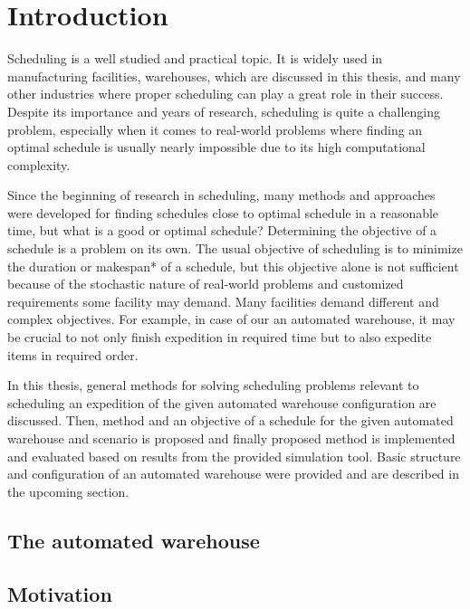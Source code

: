 \documentclass{ctuthesis}
\begin{document}
\maketitle

\chapter{Introduction}

Scheduling is a well studied and practical topic. It is widely used in manufacturing facilities, warehouses, which are discussed in this thesis, and many other industries where proper scheduling can play a great role in their success. Despite its importance and years of research, scheduling is quite a challenging problem, especially when it comes to real-world problems where finding an optimal schedule is usually nearly impossible due to its high computational complexity. 

Since the beginning of research in scheduling, many methods and approaches were developed for finding schedules close to optimal schedule in a reasonable time, but what is a good or optimal schedule? Determining the objective of a schedule is a problem on its own. The usual objective of scheduling is to minimize the duration or makespan* of a schedule, but this objective alone is not sufficient because of the stochastic nature of real-world problems and customized requirements some facility may demand. Many facilities demand different and complex objectives. For example, in case of our an automated warehouse, it may be crucial to not only finish expedition in required time but to also expedite items in required order. 

In this thesis, general methods for solving scheduling problems relevant to scheduling an expedition of the given automated warehouse configuration are discussed. Then, method and an objective of a schedule for the given automated warehouse and scenario is proposed and finally proposed method is implemented and evaluated based on results from the provided simulation tool. Basic structure and configuration of an automated warehouse were provided and are described in the upcoming section.
\section{The automated warehouse}
\section{Motivation}
\end{document}
